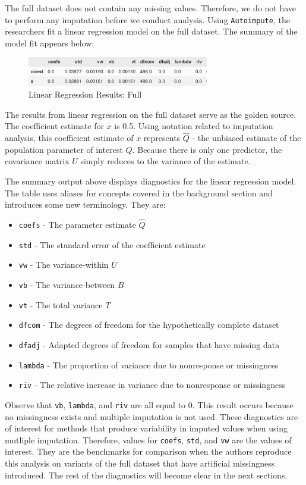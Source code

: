 \documentclass[12pt,oneside]{chicagocapstone}
\providecommand{\tightlist}{%
  \setlength{\itemsep}{0pt}\setlength{\parskip}{0pt}}
\begin{document}
The full dataset does not contain any missing values. Therefore, we do
not have to perform any imputation before we conduct analysis. Using
\texttt{Autoimpute}, the researchers fit a linear regression model on
the full dataset. The summary of the model fit appears below:
\begin{figure}

{\centering \includegraphics[width=300px]{figure/full-regression} 

}

\caption{Linear Regression Results: Full}\label{fig:full-regression}
\end{figure}
The results from linear regression on the full dataset serve as the
golden source. The coefficient estimate for \(x\) is 0.5. Using notation
related to imputation analysis, this coefficient estimate of \(x\)
represents \(\hat Q\) - the unbiased estimate of the population
parameter of interest \(Q\). Because there is only one predictor, the
covariance matrix \(U\) simply reduces to the variance of the estimate.

The summary output above displays diagnostics for the linear regression
model. The table uses aliases for concepts covered in the background
section and introduces some new terminology. They are:
\begin{itemize}
\tightlist
\item
  \texttt{coefs} - The parameter estimate \(\hat Q\)
\item
  \texttt{std} - The standard error of the coefficient estimate
\item
  \texttt{vw} - The variance-within \(\bar U\)
\item
  \texttt{vb} - The variance-between \(B\)
\item
  \texttt{vt} - The total variance \(T\)
\item
  \texttt{dfcom} - The degrees of freedom for the hypothetically
  complete dataset
\item
  \texttt{dfadj} - Adapted degrees of freedom for samples that have
  missing data
\item
  \texttt{lambda} - The proportion of variance due to nonresponse or
  missingness
\item
  \texttt{riv} - The relative increase in variance due to nonresponse or
  missingness
\end{itemize}
Observe that \texttt{vb}, \texttt{lambda}, and \texttt{riv} are all
equal to 0. This result occurs because no missingness exists and
multiple imputation is not used. These diagnostics are of interest for
methods that produce variability in imputed values when using mutliple
imputation. Therefore, values for \texttt{coefs}, \texttt{std}, and
\texttt{vw} are the values of interest. They are the benchmarks for
comparison when the authors reproduce this analysis on variants of the
full dataset that have artificial missingness introduced. The rest of
the diagnostics will become clear in the next sections.
\end{document}
